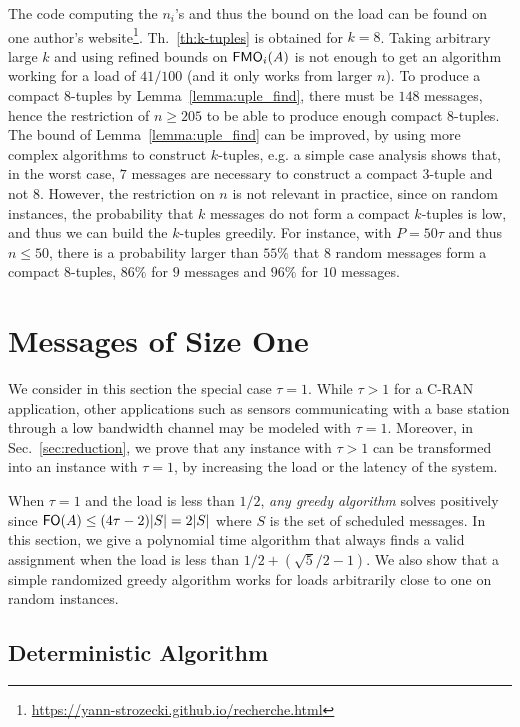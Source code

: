 \documentclass[pdflatex,sn-mathphys,iicol]{sn-jnl}%
\theoremstyle{thmstyleone}%
\theoremstyle{thmstyletwo}%
\theoremstyle{thmstylethree}%
\begin{document}
The code computing the $n_i$'s and thus the bound on the load can be found on one author's website\footnote{\url{https://yann-strozecki.github.io/recherche.html}}. Th.~\ref{th:k-tuples} is obtained for $k=8$. Taking arbitrary large $k$ and using refined bounds on $\textsf{FMO}_i(A)$ is not enough to get an algorithm working for a load of $41/100$ (and it only works from larger $n$). To produce a compact $8$-tuples by Lemma~\ref{lemma:uple_find}, there must be $148$ messages, hence the restriction of $n \geq 205$ to be able to produce enough compact $8$-tuples.
The bound of Lemma~\ref{lemma:uple_find} can be improved, by using more complex algorithms to construct $k$-tuples, e.g. a simple case analysis shows that, in the worst case, $7$ messages are necessary to construct a compact $3$-tuple and not $8$. However, the restriction on $n$ is not relevant in practice, since on random instances, the probability that $k$ messages do not form a compact $k$-tuples is low, and thus we can build the $k$-tuples greedily. For instance, with $P=50\tau$ and thus $n \leq 50$, there is a probability larger than $55\%$ that $8$ random messages form a compact $8$-tuples, $86\%$ for $9$ messages and $96\%$ for $10$ messages.


\section{Messages of Size One} \label{sec:small}

We consider in this section the special case $\tau = 1$. While $\tau > 1$ for a C-RAN application, other applications such as sensors communicating with a base station through a low bandwidth channel may be modeled with $\tau = 1$. Moreover, in Sec.~\ref{sec:reduction}, we prove that any instance with $\tau >1$ can be transformed into an instance with $\tau = 1$, by increasing the load or the latency of the system.

When $\tau = 1$ and the load is less than $1/2$, \emph{any greedy algorithm} solves \pma positively since $\textsf{FO}(A) \leq (4\tau -2)\lvert S\rvert = 2\lvert S\rvert$ where $S$ is the set of scheduled messages. In this section, we give a polynomial time algorithm that always finds a valid assignment when the load is less than $1/2 + (\sqrt{5}/2 -1)$. We also show that a simple randomized greedy algorithm
works for loads arbitrarily close to one on random instances.

\subsection{Deterministic Algorithm}
\end{document}

